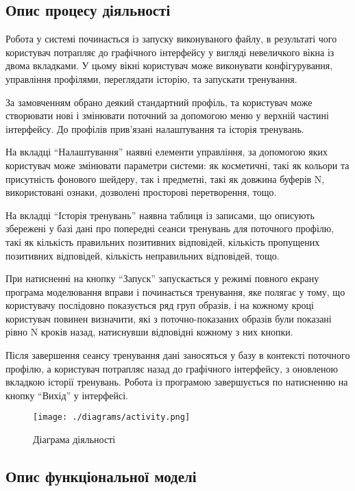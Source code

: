 \subsection{Опис процесу діяльності}

Робота у системі починається із запуску виконуваного файлу, в результаті чого користувач потрапляє до графічного інтерфейсу у вигляді невеличкого вікна із двома вкладками. У цьому вікні користувач може виконувати конфігурування, управління профілями, переглядати історію, та запускати тренування.

За замовченням обрано деякий стандартний профіль, та користувач може створювати нові і змінювати поточний за допомогою меню у верхній частині інтерфейсу. До профілів прив'язані налаштування та історія тренувань.

На вкладці ``Налаштування'' наявні елементи управління, за допомогою яких користувач може змінювати параметри системи: як косметичні, такі як кольори та присутність фонового шейдеру, так і предметні, такі як довжина буферів N, використовані ознаки, дозволені просторові перетворення, тощо.

На вкладці ``Історія тренувань'' наявна таблиця із записами, що описують збережені у базі дані про попередні сеанси тренувань для поточного профілю, такі як кількість правильних позитивних відповідей, кількість пропущених позитивних відповідей, кількість неправильних відповідей, тощо.

При натисненні на кнопку ``Запуск'' запускається у режимі повного екрану програма моделювання вправи і починається тренування, яке полягає у тому, що користувачу послідовно показується ряд груп образів, і на кожному кроці користувач повинен визначити, які з поточно-показаних образів були показані рівно N кроків назад, натиснувши відповідні кожному з них кнопки.

Після завершення сеансу тренування дані заносяться у базу в контексті поточного профілю, а користувач потрапляє назад до графічного інтерфейсу, з оновленою вкладкою історії тренувань. Робота із програмою завершується по натисненню на кнопку ``Вихід'' у інтерфейсі.

\begin{figure}[here]
  \caption{Діаграма діяльності}
  \centering\texttt{[image: ./diagrams/activity.png]}
  \label{fig:activity}
\end{figure}

\subsection{Опис функціональної моделі}

